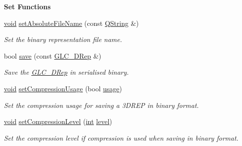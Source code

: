 \begin{Indent}{\bf Set Functions}\par
\begin{DoxyCompactItemize}
\item 
\hyperlink{group___u_a_v_objects_plugin_ga444cf2ff3f0ecbe028adce838d373f5c}{void} \hyperlink{class_g_l_c___b_s_rep_ae7cf09e408db310784006fc471d8e8ae}{set\-Absolute\-File\-Name} (const \hyperlink{group___u_a_v_objects_plugin_gab9d252f49c333c94a72f97ce3105a32d}{Q\-String} \&)
\begin{DoxyCompactList}\small\item\em Set the binary representation file name. \end{DoxyCompactList}\item 
bool \hyperlink{class_g_l_c___b_s_rep_a51d835aeaa2cf2ec179eb2f658c4a0ef}{save} (const \hyperlink{class_g_l_c__3_d_rep}{G\-L\-C\-\_\-D\-Rep} \&)
\begin{DoxyCompactList}\small\item\em Save the \hyperlink{class_g_l_c__3_d_rep}{G\-L\-C\-\_\-D\-Rep} in serialised binary. \end{DoxyCompactList}\item 
\hyperlink{group___u_a_v_objects_plugin_ga444cf2ff3f0ecbe028adce838d373f5c}{void} \hyperlink{class_g_l_c___b_s_rep_a841f0e6c1e2b9b5c2d7d6b7fe9b8304a}{set\-Compression\-Usage} (bool \hyperlink{glext_8h_ae759ed0394ed5353d8bef2fb755305da}{usage})
\begin{DoxyCompactList}\small\item\em Set the compression usage for saving a 3\-D\-R\-E\-P in binary format. \end{DoxyCompactList}\item 
\hyperlink{group___u_a_v_objects_plugin_ga444cf2ff3f0ecbe028adce838d373f5c}{void} \hyperlink{class_g_l_c___b_s_rep_a1a76917d63157b1c9d9e54b46f5495a8}{set\-Compression\-Level} (\hyperlink{ioapi_8h_a787fa3cf048117ba7123753c1e74fcd6}{int} \hyperlink{glext_8h_abc60a79088789bd61297bf5f9ff500d1}{level})
\begin{DoxyCompactList}\small\item\em Set the compression level if compression is used when saving in binary format. \end{DoxyCompactList}\end{DoxyCompactItemize}
\end{Indent}
